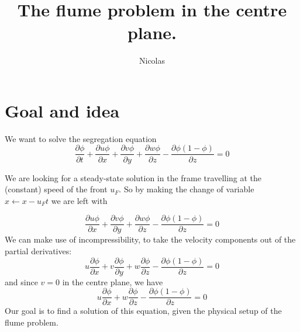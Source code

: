 \documentclass[11pt]{article}
\title{\textbf{The flume problem in the centre plane.}}
\author{Nicolas}
\date{}
\newcommand{\p}[2]{\ensuremath{\frac{\partial {#1}}{\partial {#2}}}}
\begin{document}
\maketitle

\section{Goal and idea}
We want to solve the segregation equation
\begin{equation} \label{eq:conservative_form}
	\p{\phi}{t} + \p{u\phi}{x} + \p{v\phi}{y} + \p{w\phi}{z} - \p{\phi(1-\phi)}{z} = 0
\end{equation}

We are looking for a steady-state solution in the frame travelling at the (constant) speed of the front $u_F$. So by making the change of variable $ x \leftarrow x - u_F t$ we are left with

\begin{equation}
	\p{u\phi}{x} + \p{v\phi}{y} + \p{w\phi}{z} - \p{\phi(1-\phi)}{z} = 0
\end{equation}
We can make use of incompressibility, to take the velocity components out of the partial derivatives:
\begin{equation}
	u\p{\phi}{x} + v\p{\phi}{y} + w\p{\phi}{z} - \p{\phi(1-\phi)}{z} = 0
\end{equation}
and since $v = 0$ in the centre plane, we have
\begin{equation} \label{eq:segreg}
	u\p{\phi}{x} + w\p{\phi}{z} - \p{\phi(1-\phi)}{z} = 0
\end{equation}
Our goal is to find a solution of this equation, given the physical setup of the flume problem.
\end{document}
